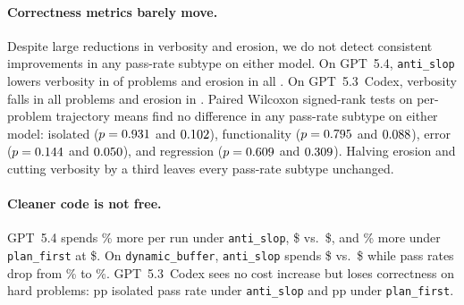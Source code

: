 \paragraph{Correctness metrics barely move.}
Despite large reductions in verbosity and erosion, we do not detect consistent improvements in any pass-rate subtype on either model. On GPT~5.4, \texttt{anti\_slop} lowers verbosity in \psOrthGptFiveFourVerbDecCount{} of \psOrthGptFiveFourNProblem{} problems and erosion in all \psOrthGptFiveFourEroDecCount{}. On GPT~5.3~Codex, verbosity falls in all \psOrthCodexVerbDecCount{} problems and erosion in \psOrthCodexEroDecCount. Paired Wilcoxon signed-rank tests on per-problem trajectory means find no difference in any pass-rate subtype on either model: isolated ($p = 0.931$ and $0.102$), functionality ($p = 0.795$ and $0.088$), error ($p = 0.144$ and $0.050$), and regression ($p = 0.609$ and $0.309$). Halving erosion and cutting verbosity by a third leaves every pass-rate subtype unchanged.


\paragraph{Cleaner code is not free.}
GPT~5.4 spends \psGptFiveFourAntiSlopCostPctDiff\% more per run under \texttt{anti\_slop}, \$\psGptFiveFourAntiSlopCost{} vs.\ \$\psGptFiveFourBaselineCost{}, and \psGptFiveFourPlanFirstCostPctDiff\% more under \texttt{plan\_first} at \$\psGptFiveFourPlanFirstCost. On \texttt{dynamic\_buffer}, \texttt{anti\_slop} spends \$\psGptFiveFourAntiSlopDbCost{} vs.\ \$\psGptFiveFourBaselineDbCost{} while pass rates drop from \psGptFiveFourBaselineDbIsoPass\% to \psGptFiveFourAntiSlopDbIsoPass\%. GPT~5.3~Codex sees no cost increase but loses correctness on hard problems: \psCodexAntiSlopIsoPassDiffPp{}pp isolated pass rate under \texttt{anti\_slop} and \psCodexPlanFirstIsoPassDiffPp{}pp under \texttt{plan\_first}.

